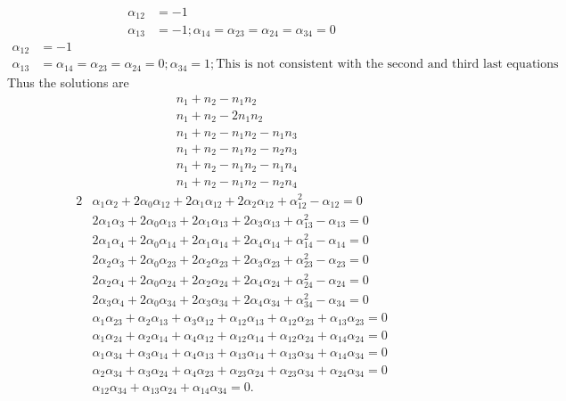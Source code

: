 \documentclass[aps,preprint]{revtex4}%
\begin{document}
\begin{align}
\alpha_{12}  &  =-1\\
\alpha_{13}  &  =-1;\alpha_{14}=\alpha_{23}=\alpha_{24}=\alpha_{34}=0
\end{align}%
\begin{align}
\alpha_{12}  &  =-1\\
\alpha_{13}  &  =\alpha_{14}=\alpha_{23}=\alpha_{24}=0;\alpha_{34}%
=1;\text{This is not consistent with the second and third last equations}%
\end{align}
Thus the solutions are
\begin{align*}
&  n_{1}+n_{2}-n_{1}n_{2}\\
&  n_{1}+n_{2}-2n_{1}n_{2}\\
&  n_{1}+n_{2}-n_{1}n_{2}-n_{1}n_{3}\\
&  n_{1}+n_{2}-n_{1}n_{2}-n_{2}n_{3}\\
&  n_{1}+n_{2}-n_{1}n_{2}-n_{1}n_{4}\\
&  n_{1}+n_{2}-n_{1}n_{2}-n_{2}n_{4}%
\end{align*}%
\begin{align}
2  &  \alpha_{1}\alpha_{2}+2\alpha_{0}\alpha_{12}+2\alpha_{1}\alpha
_{12}+2\alpha_{2}\alpha_{12}+\alpha_{12}^{2}-\alpha_{12}=0\nonumber\\
&  2\alpha_{1}\alpha_{3}+2\alpha_{0}\alpha_{13}+2\alpha_{1}\alpha_{13}%
+2\alpha_{3}\alpha_{13}+\alpha_{13}^{2}-\alpha_{13}=0\nonumber\\
&  2\alpha_{1}\alpha_{4}+2\alpha_{0}\alpha_{14}+2\alpha_{1}\alpha_{14}%
+2\alpha_{4}\alpha_{14}+\alpha_{14}^{2}-\alpha_{14}=0\nonumber\\
&  2\alpha_{2}\alpha_{3}+2\alpha_{0}\alpha_{23}+2\alpha_{2}\alpha_{23}%
+2\alpha_{3}\alpha_{23}+\alpha_{23}^{2}-\alpha_{23}=0\nonumber\\
&  2\alpha_{2}\alpha_{4}+2\alpha_{0}\alpha_{24}+2\alpha_{2}\alpha_{24}%
+2\alpha_{4}\alpha_{24}+\alpha_{24}^{2}-\alpha_{24}=0\nonumber\\
&  2\alpha_{3}\alpha_{4}+2\alpha_{0}\alpha_{34}+2\alpha_{3}\alpha_{34}%
+2\alpha_{4}\alpha_{34}+\alpha_{34}^{2}-\alpha_{34}=0\nonumber\\
&  \alpha_{1}\alpha_{23}+\alpha_{2}\alpha_{13}+\alpha_{3}\alpha_{12}%
+\alpha_{12}\alpha_{13}+\alpha_{12}\alpha_{23}+\alpha_{13}\alpha
_{23}=0\nonumber\\
&  \alpha_{1}\alpha_{24}+\alpha_{2}\alpha_{14}+\alpha_{4}\alpha_{12}%
+\alpha_{12}\alpha_{14}+\alpha_{12}\alpha_{24}+\alpha_{14}\alpha
_{24}=0\nonumber\\
&  \alpha_{1}\alpha_{34}+\alpha_{3}\alpha_{14}+\alpha_{4}\alpha_{13}%
+\alpha_{13}\alpha_{14}+\alpha_{13}\alpha_{34}+\alpha_{14}\alpha
_{34}=0\nonumber\\
&  \alpha_{2}\alpha_{34}+\alpha_{3}\alpha_{24}+\alpha_{4}\alpha_{23}%
+\alpha_{23}\alpha_{24}+\alpha_{23}\alpha_{34}+\alpha_{24}\alpha
_{34}=0\nonumber\\
&  \alpha_{12}\alpha_{34}+\alpha_{13}\alpha_{24}+\alpha_{14}\alpha_{34}=0.
\end{align}
\end{document}
